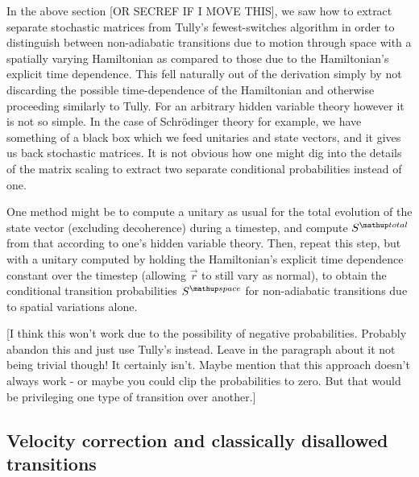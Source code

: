 In the above section [OR SECREF IF I MOVE THIS], we saw how to extract separate stochastic matrices from Tully's fewest-switches algorithm in order to distinguish between non-adiabatic transitions due to motion through space with a spatially varying Hamiltonian as compared to those due to the Hamiltonian's explicit time dependence. This fell naturally out of the derivation simply by not discarding the possible time-dependence of the Hamiltonian and otherwise proceeding similarly to Tully. For an arbitrary hidden variable theory however it is not so simple. In the case of Schr\"odinger theory for example, we have something of a black box which we feed unitaries and state vectors, and it gives us back stochastic matrices. It is not obvious how one might dig into the details of the matrix scaling to extract two separate conditional probabilities instead of one.

One method might be to compute a unitary as usual for the total evolution of the state vector (excluding decoherence) during a timestep, and compute $S^\up{total}$ from that according to one's hidden variable theory. Then, repeat this step, but with a unitary computed by holding the Hamiltonian's explicit time dependence constant over the timestep (allowing $\vec r$ to still vary as normal), to obtain the conditional transition probabilities $S^\up{space}$ for non-adiabatic transitions due to spatial variations alone.


[I think this won't work due to the possibility of negative probabilities. 
Probably abandon this and just use Tully's instead. Leave in the paragraph about it not being trivial though! It certainly isn't. Maybe mention that this approach doesn't always work - or maybe you could clip the probabilities to zero. But that would be privileging one type of transition over another.]

\subsection{Velocity correction and classically disallowed transitions}

